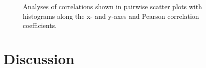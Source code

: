 \documentclass[paper=A4,bibliography=totocnumbered]{scrartcl}
\begin{document}
\begin{figure}[h!]
	\centering
	\qquad
	\qquad
	\caption{Analyses of correlations shown in pairwise scatter plots with histograms along the x- and y-axes and Pearson correlation coefficients.}
	\label{fig:corr}
\end{figure}

\section{Discussion}
\end{document}
